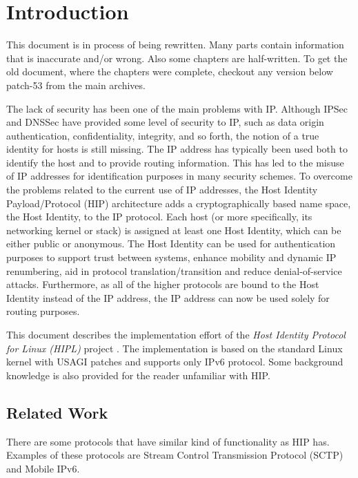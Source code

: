 \section{Introduction}
\label{sec:introduction}


{\large This document is in process of being rewritten. Many parts contain
information that is inaccurate and/or wrong. Also some chapters are half-written.
To get the old document, where the chapters were complete, checkout any
version below patch-53 from the main archives.}
\vspace{2in}

The lack of security has been one of the main problems with
IP. Although IPSec \cite{rfc2401} and DNSSec \cite{rfc3008} have
provided some level of security to IP, such as data origin
authentication, confidentiality, integrity, and so forth, the notion
of a true identity for hosts is still missing. The IP address has
typically been used both to identify the host and to provide routing
information. This has led to the misuse of IP addresses for
identification purposes in many security schemes. To overcome the
problems related to the current use of IP addresses, the Host Identity
Payload/Protocol (HIP) architecture adds a cryptographically based
name space, the Host Identity, to the IP protocol.  Each host (or more
specifically, its networking kernel or stack) is assigned at least one
Host Identity, which can be either public or anonymous. The Host
Identity can be used for authentication purposes to support trust
between systems, enhance mobility and dynamic IP renumbering, aid in
protocol translation/transition and reduce denial-of-service
attacks. Furthermore, as all of the higher protocols are bound to the
Host Identity instead of the IP address, the IP address can now be
used solely for routing purposes.

This document describes the implementation effort of the \textit{Host
Identity Protocol for Linux (HIPL)} project \cite{hipl}. The
implementation is based on the standard Linux kernel with USAGI
patches and supports only IPv6 protocol. Some background knowledge is
also provided for the reader unfamiliar with HIP.

\subsection{Related Work}
\label{sec:related_work}

There are some protocols that have similar kind of functionality as
HIP has. Examples of these protocols are Stream Control Transmission
Protocol (SCTP) and Mobile IPv6.

